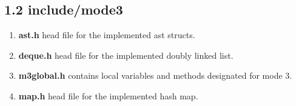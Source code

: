 \subsection*{1.2 \large\textbf{include/mode3}}
\begin{enumerate}
    \item \textbf{ast.h} head file for the implemented ast structs.
    
    \item \textbf{deque.h} head file for the implemented doubly linked list.
    
    \item \textbf{m3global.h} contains local variables and methods designated for mode 3.
    
    \item \textbf{map.h} head file for the implemented hash map.
\end{enumerate} 